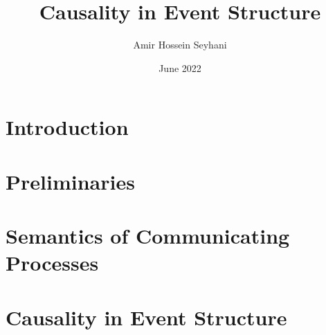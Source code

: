 \documentclass{article}
\title{Causality in Event Structure}
\author{Amir Hossein Seyhani}
\date{June 2022}
\begin{document}
\maketitle

\tableofcontents
\pagebreak

\section{Introduction}

\section{Preliminaries}


\section{Semantics of Communicating Processes}


\section{Causality in Event Structure}


\pagebreak
\begin{appendices}
\end{appendices}
\end{document}
